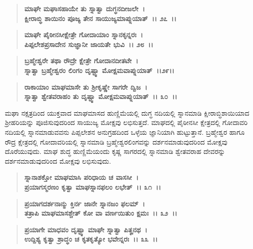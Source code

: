 \begin{verse}
\textbf{ಮಾಘೇ ಮಘಾಸಹಾಯೇ ತು ಸ್ನಾತ್ವಾ ದುಗ್ಧನದೀಜಲೇ~।}\\\textbf{ಕ್ಷೀರಾಬ್ಧಿ ಶಾಯಿನಂ ಪೂಜ್ಯ ತೇನ ಸಾಯುಜ್ಯಮಾಪ್ನುಯಾತ್~।। ೨೭~।।}
\end{verse}

\begin{verse}
\textbf{ಮಾಘೇ ಪೈಠೀನಸೀಕ್ಷೇತ್ರೇ ಗೋದಾಯಾಂ ಸ್ನಾನಕೃನ್ನರಃ~।}\\\textbf{ಪಿಪ್ಪಲೇಶಪ್ರಸಾದೇನ ಸುಜ್ಞಾನೀ ಜಾಯತೇ ಭುವಿ~।। ೨೮~।। }
\end{verse}

\begin{verse}
\textbf{ಬ್ರಹ್ಮೇಶ್ವರೇ ತಥಾ ರೌದ್ರೇ ಕ್ಷೇತ್ರೇ ಗೋದಾನದೀತಟೇ~।}\\\textbf{ಸ್ನಾತ್ವಾ ಬ್ರಹ್ಮೇಶ್ವರಂ ಲಿಂಗಂ ದೃಷ್ಟ್ವಾ ಮೋಕ್ಷಮವಾಪ್ನುಯಾತ್~।।೨೯।।} 
\end{verse}

\begin{verse}
\textbf{ರಾಕಾಯಾಂ ಮಾಘಮಾಸೇ ತು ಶ‍್ರೀಕೃಷ್ಣೇ ಸಾಗರೇ ದ್ವಿಜ~।}\\\textbf{ಸ್ನಾತ್ವಾ ಶ್ವೇತವರಾಹಂ ತು ದೃಷ್ಟ್ವಾ ಮೋಕ್ಷಮವಾಪ್ನುಯಾತ್~।। ೩೦~।।}
\end{verse}

ಮಘಾ ನಕ್ಷತ್ರದಿಂದ ಯುಕ್ತವಾದ ಮಾಘಮಾಸದ ಹುಣ್ಣಿಮೆಯಲ್ಲಿ ದುಗ್ಧ ನದಿಯಲ್ಲಿ ಸ್ನಾನಮಾಡಿ ಕ್ಷೀರಾಬ್ಧಿಶಾಯಿಯಾದ ಶ‍್ರೀಹರಿಯನ್ನು ಪೂಜಿಸುವುದರಿಂದ ಸಾಯುಜ್ಯ ಮೋಕ್ಷವು ಲಭಿಸುತ್ತದೆ. ಮಾಘದಲ್ಲಿ ಪೈಠೀನಸೀ ಕ್ಷೇತ್ರದಲ್ಲಿ ಗೋದಾವರಿ ನದಿಯಲ್ಲಿ ಸ್ನಾನಮಾಡುವವನು ಪಿಪ್ಪಲೇಶನ ಅನುಗ್ರಹದಿಂದ ಒಳ್ಳೆಯ ಜ್ಞಾನಿಯಾಗಿ ಹುಟ್ಟುತ್ತಾನೆ. ಬ್ರಹ್ಮೇಶ್ವರ ಹಾಗೂ ರೌದ್ರ ಕ್ಷೇತ್ರದಲ್ಲಿ ಗೋದಾವರಿಯಲ್ಲಿ ಸ್ನಾನಮಾಡಿ ಬ್ರಹ್ಮೇಶ್ವರಲಿಂಗವನ್ನು ದರ್ಶನಮಾಡುವುದರಿಂದ ಮೋಕ್ಷವು ದೊರೆಯುವುದು. ಮಾಘ ಶುದ್ಧ ಹುಣ್ಣಿಮೆಯಂದು ಕೃಷ್ಣ ಸಾಗರದಲ್ಲಿ ಸ್ನಾನಮಾಡಿ ಶ್ವೇತವರಾಹ ದೇವರನ್ನು ದರ್ಶನಮಾಡುವುದರಿಂದ ಮೋಕ್ಷವು ಲಭಿಸುವುದು.

\begin{verse}
\textbf{ಸ್ನಾನಾಶಕ್ತೋ ಮಾಘಮಾಸಿ ಪರಿಧಾಯ ಚ ವಾಸಸೀ~।}\\\textbf{ಪ್ರಯಾಗಸ್ಮರಣಂ ಕೃತ್ವಾ ಮಾಘಸ್ನಾನಫಲಂ ಲಭೇತ್~।। ೩೧~।। }
\end{verse}

\begin{verse}
\textbf{ಪ್ರಯಾಗದರ್ಶನಾನ್ಮು ಕ್ತಿರ್ನ ಜಾನೇ ಸ್ನಾನಜಂ ಫಲಮ್~।}\\\textbf{ತತ್ರಾಪಿ ಮಾಘಮಾಸಶ್ಚೇತ್ ಕೋ ವಾ ವರ್ಣಯಿತುಂ ಕ್ಷಮಃ~।। ೩೨~।। }
\end{verse}

\begin{verse}
\textbf{ಪ್ರಯಾಗೇ ಮಾಧವಂ ದೃಷ್ಟ್ವಾ ಮಾಘೇ ಸ್ನಾತ್ವಾ ಪಿತೄನಥ~।}\\\textbf{ಉದ್ದಿಶ್ಯ ಕೃತ್ವಾ ಶ್ರಾದ್ಧಂ ಚ ಕೃತಕೃತ್ಯೋ ಭವೇನ್ನರಃ~।। ೩೩~।।}
\end{verse}

